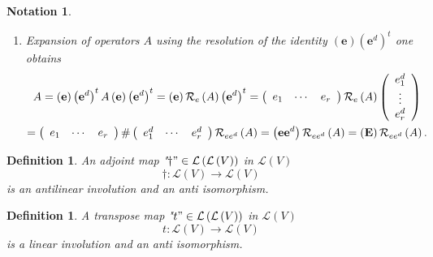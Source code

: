 \documentclass[aps,preprint]{revtex4}%
\newtheorem{definition}[theorem]{Definition}
\newtheorem{notation}[theorem]{Notation}
\begin{document}
\begin{notation}
\begin{enumerate}
\item Expansion of operators $A$ using the resolution of the identity $\left(
\mathbf{e}\right)  \left(  \mathbf{e}^{d}\right)  ^{t}$ one obtains
\begin{gather}
A=\left(  \mathbf{e}\right)  \left(  \mathbf{e}^{d}\right)  ^{t}A\left(
\mathbf{e}\right)  \left(  \mathbf{e}^{d}\right)  ^{t}=\left(  \mathbf{e}%
\right)  \mathcal{R}_{e}\left(  A\right)  \left(  \mathbf{e}^{d}\right)
^{t}=\left(
\begin{array}
[c]{ccc}%
e_{1} & \cdots & e_{r}%
\end{array}
\right)  \mathcal{R}_{e}\left(  A\right)  \left(
\begin{array}
[c]{c}%
e_{1}^{d}\\
\vdots\\
e_{r}^{d}%
\end{array}
\right) \\
=\left(
\begin{array}
[c]{ccc}%
e_{1} & \cdots & e_{r}%
\end{array}
\right)  \#\left(
\begin{array}
[c]{ccc}%
e_{1}^{d} & \cdots & e_{r}^{d}%
\end{array}
\right)  \mathcal{R}_{ee^{d}}\left(  A\right)  =\left(  \mathbf{ee}%
^{d}\right)  \mathcal{R}_{ee^{d}}\left(  A\right)  =\left(  \mathbf{E}\right)
\mathcal{R}_{ee^{d}}\left(  A\right)  .
\end{gather}

\end{enumerate}
\end{notation}

\begin{definition}
An adjoint map "$\dagger"\in\mathcal{L}\left(  \mathcal{L}\left(  V\right)
\right)  $ in $\mathcal{L}\left(  V\right)  $
\begin{equation}
\dagger:\mathcal{L}\left(  V\right)  \rightarrow\mathcal{L}\left(  V\right)
\end{equation}
is an \emph{antilinear} involution and an \emph{anti isomorphism}.
\end{definition}

\begin{definition}
A transpose map "$t"\in\mathcal{L}\left(  \mathcal{L}\left(  V\right)
\right)  $ in $\mathcal{L}\left(  V\right)  $%
\begin{equation}
t:\mathcal{L}\left(  V\right)  \rightarrow\mathcal{L}\left(  V\right)
\end{equation}
is a \emph{linear involution} and an \emph{anti isomorphism}.
\end{definition}
\end{document}
